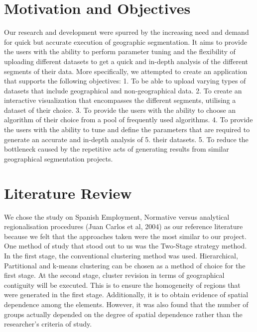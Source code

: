 \documentclass{acm_proc_article-sp}
\begin{document}
\hypertarget{motivation-and-objectives}{%
\section{Motivation and Objectives}\label{motivation-and-objectives}}

Our research and development were spurred by the increasing need and
demand for quick but accurate execution of geographic segmentation. It
aims to provide the users with the ability to perform parameter tuning
and the flexibility of uploading different datasets to get a quick and
in-depth analysis of the different segments of their data. More
specifically, we attempted to create an application that supports the
following objectives: 1. To be able to upload varying types of datasets
that include geographical and non-geographical data. 2. To create an
interactive visualization that encompasses the different segments,
utilising a dataset of their choice. 3. To provide the users with the
ability to choose an algorithm of their choice from a pool of frequently
used algorithms. 4. To provide the users with the ability to tune and
define the parameters that are required to generate an accurate and
in-depth analysis of 5. their datasets. 5. To reduce the bottleneck
caused by the repetitive acts of generating results from similar
geographical segmentation projects.

\hypertarget{literature-review}{%
\section{Literature Review}\label{literature-review}}

We chose the study on Spanish Employment, Normative versus analytical
regionalisation procedures (Juan Carlos et al, 2004) as our reference
literature because we felt that the approaches taken were the most
similar to our project. One method of study that stood out to us was the
Two-Stage strategy method. In the first stage, the conventional
clustering method was used. Hierarchical, Partitional and k-means
clustering can be chosen as a method of choice for the first stage. At
the second stage, cluster revision in terms of geographical contiguity
will be executed. This is to ensure the homogeneity of regions that were
generated in the first stage. Additionally, it is to obtain evidence of
spatial dependence among the elements. However, it was also found that
the number of groups actually depended on the degree of spatial
dependence rather than the researcher's criteria of study.
\end{document}
